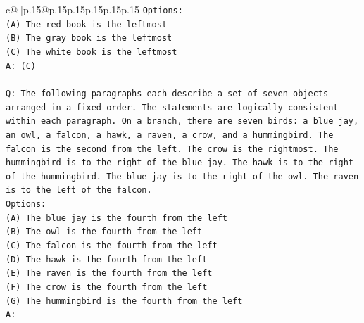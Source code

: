 \documentclass{article}
\begin{document}
{\begin{supertabular}{c@{$\;$}|p{.15\linewidth}@{}p{.15\linewidth}p{.15\linewidth}p{.15\linewidth}p{.15\linewidth}p{.15\linewidth}}
{{{\texttt{Options:} \\
\texttt{(A) The red book is the leftmost} \\
\texttt{(B) The gray book is the leftmost} \\
\texttt{(C) The white book is the leftmost} \\
\texttt{A: (C)} \\
\\ 
\texttt{Q: The following paragraphs each describe a set of seven objects arranged in a fixed order. The statements are logically consistent within each paragraph. On a branch, there are seven birds: a blue jay, an owl, a falcon, a hawk, a raven, a crow, and a hummingbird. The falcon is the second from the left. The crow is the rightmost. The hummingbird is to the right of the blue jay. The hawk is to the right of the hummingbird. The blue jay is to the right of the owl. The raven is to the left of the falcon.} \\
\texttt{Options:} \\
\texttt{(A) The blue jay is the fourth from the left} \\
\texttt{(B) The owl is the fourth from the left} \\
\texttt{(C) The falcon is the fourth from the left} \\
\texttt{(D) The hawk is the fourth from the left} \\
\texttt{(E) The raven is the fourth from the left} \\
\texttt{(F) The crow is the fourth from the left} \\
\texttt{(G) The hummingbird is the fourth from the left} \\
\texttt{A:} \\
            }
        }
    }
     \\ \\


\end{supertabular}}
\end{document}
